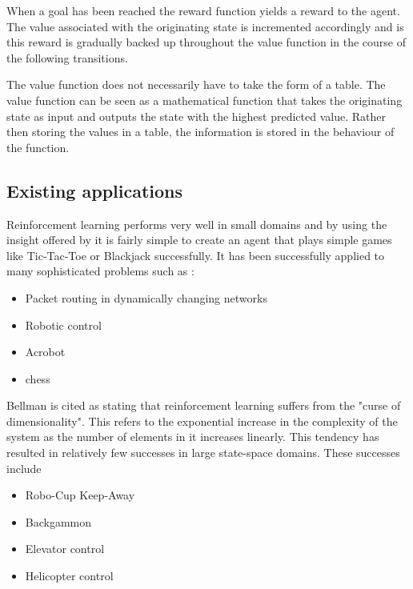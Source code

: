 \documentclass{rucsthesis}
\begin{document}
When a goal has been reached the reward function yields a reward to the agent.  The value  associated with the originating state is incremented accordingly and is this reward is gradually backed up throughout the value function in the course of the following transitions\citep{suttonbarto}.

The value function does not necessarily have to take the form of a table. The value function can be seen as a mathematical function that takes the originating state as input and outputs the state with the highest predicted value. Rather then storing the values in a table, the information is stored in the behaviour of the function.

\subsection{Existing applications}

Reinforcement learning performs very well in small domains and by using the insight offered by \cite{suttonbarto} it is fairly simple to create an agent that plays simple games like Tic-Tac-Toe or Blackjack successfully. It has been successfully applied to many sophisticated problems such as :

\begin{itemize}
\item{Packet routing in dynamically changing networks \citep{boyan94packet}}
\item{Robotic control \citep{rlrobotics}}
\item{Acrobot \citep{suttonbarto} }
\item{chess \citep{baxter98knightcap}}
\end{itemize}

Bellman is cited \citep{suttonbarto} as stating that reinforcement learning suffers from the "curse of dimensionality".  This refers to the exponential increase in the complexity of the system as the number of elements in it increases linearly. This tendency has resulted in relatively few successes in large state-space domains\citep{keepaway}. These successes include 

\begin{itemize}
\item{Robo-Cup Keep-Away \citep{keepaway}}
\item{Backgammon \citep{tdgammon}}
\item{Elevator control \citep{elevator}}
\item{Helicopter control}
\end{itemize}
\end{document}
